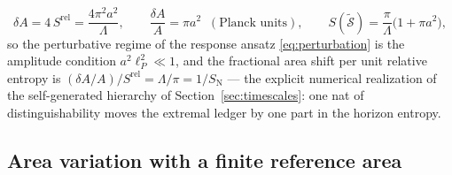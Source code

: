 \documentclass[11pt]{article}
\newcommand{\Srel}{S^{\mathrm{rel}}}
\begin{document}
\begin{equation}
\delta A = 4\,\Srel = \frac{4\pi^2 a^2}{\Lambda},
\qquad
\frac{\delta A}{A} = \pi a^2
\;\;(\text{Planck units}),
\qquad
S(\tilde{\mathcal{S}}) = \frac{\pi}{\Lambda}\big(1 + \pi a^2\big),
\label{eq:example-area}
\end{equation}
so the perturbative regime of the response ansatz \eqref{eq:perturbation} is the amplitude condition $a^2 \ell_P^2 \ll 1$, and the fractional area shift per unit relative entropy is $(\delta A/A)/\Srel = \Lambda/\pi = 1/S_{\mathrm{N}}$ --- the explicit numerical realization of the self-generated hierarchy of Section~\ref{sec:timescales}: one nat of distinguishability moves the extremal ledger by one part in the horizon entropy.

\subsection{Area variation with a finite reference area}
\end{document}
